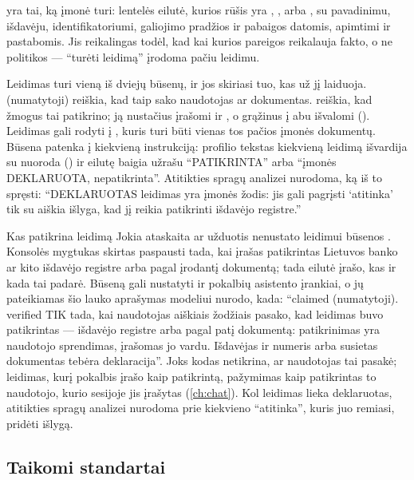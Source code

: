  yra tai, ką įmonė turi: lentelės  eilutė, kurios
rūšis yra , ,  arba , su
pavadinimu, išdavėju, identifikatoriumi, galiojimo pradžios ir pabaigos datomis, apimtimi ir
pastabomis. Jis reikalingas todėl, kad kai kurios pareigos reikalauja fakto, o ne politikos ---
\enquote{turėti leidimą} įrodoma pačiu leidimu.

Leidimas turi vieną iš dviejų būsenų, ir jos skiriasi tuo, kas už jį laiduoja.
 (numatytoji) reiškia, kad taip sako naudotojas ar dokumentas. 
reiškia, kad žmogus tai patikrino; ją nustačius įrašomi  ir
, o grąžinus į  abu išvalomi ().
Leidimas gali rodyti į , kuris turi būti vienas tos pačios įmonės
dokumentų. Būsena patenka į kiekvieną instrukciją: profilio tekstas kiekvieną leidimą
išvardija su nuoroda (\code{[C1]}) ir eilutę baigia užrašu \enquote{PATIKRINTA} arba
\enquote{įmonės DEKLARUOTA, nepatikrinta}. Atitikties spragų analizei nurodoma, ką iš to
spręsti: \enquote{DEKLARUOTAS leidimas yra įmonės žodis: jis gali pagrįsti \enquote{atitinka}
tik su aiškia išlyga, kad jį reikia patikrinti išdavėjo registre.}

\begin{humanbox}{Kas patikrina leidimą}
Jokia ataskaita ar užduotis nenustato leidimui būsenos . Konsolės mygtukas
 skirtas paspausti tada, kai įrašas patikrintas Lietuvos banko ar kito
išdavėjo registre arba pagal įrodantį dokumentą; tada eilutė įrašo, kas ir kada tai padarė.
Būseną gali nustatyti ir pokalbių asistento įrankiai, o jų pateikiamas šio lauko aprašymas
modeliui nurodo, kada: \enquote{claimed (numatytoji). verified TIK tada, kai naudotojas aiškiais
žodžiais pasako, kad leidimas buvo patikrintas --- išdavėjo registre arba pagal patį dokumentą:
patikrinimas yra naudotojo sprendimas, įrašomas jo vardu. Išdavėjas ir numeris arba susietas
dokumentas tebėra deklaracija}. Joks kodas netikrina, ar naudotojas tai pasakė; leidimas, kurį
pokalbis
įrašo kaip patikrintą, pažymimas kaip patikrintas to naudotojo, kurio sesijoje jis
įrašytas (\cref{ch:chat}). Kol leidimas lieka
deklaruotas, atitikties spragų analizei nurodoma prie kiekvieno \enquote{atitinka}, kuris juo
remiasi, pridėti išlygą.
\end{humanbox}

\subsection{Taikomi standartai}\label{sec:company:standards}

